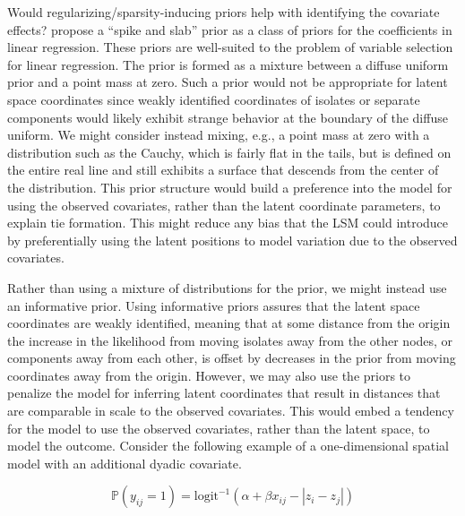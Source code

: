 \documentclass[11pt]{article}
\begin{document}
Would regularizing/sparsity-inducing priors help with identifying the covariate effects? \cite{mitchell1988} propose a ``spike and slab'' prior as a class of priors for the coefficients in linear regression. These priors are well-suited to the problem of variable selection for linear regression. The prior is formed as a mixture between a diffuse uniform prior and a point mass at zero. Such a prior would not be appropriate for latent space coordinates since weakly identified coordinates of isolates or separate components would likely exhibit strange behavior at the boundary of the diffuse uniform. We might consider instead mixing, e.g., a point mass at zero with a distribution such as the Cauchy, which is fairly flat in the tails, but is defined on the entire real line and still exhibits a surface that descends from the center of the distribution. This prior structure would build a preference into the model for using the observed covariates, rather than the latent coordinate parameters, to explain tie formation. This might reduce any bias that the LSM could introduce by preferentially using the latent positions to model variation due to the observed covariates.


Rather than using a mixture of distributions for the prior, we might instead use an informative prior. Using informative priors assures that the latent space coordinates are weakly identified, meaning that at some distance from the origin the increase in the likelihood from moving isolates away from the other nodes, or components away from each other, is offset by decreases in the prior from moving coordinates away from the origin. However, we may also use the priors to penalize the model for inferring latent coordinates that result in distances that are comparable in scale to the observed covariates. This would embed a tendency for the model to use the observed covariates, rather than the latent space, to model the outcome. Consider the following example of a one-dimensional spatial model with an additional dyadic covariate. 

$$\mathbb{P}(y_{ij} = 1) = \text{logit}^{-1}(\alpha + \beta x_{ij} -  |z_i - z_j|)$$
\end{document}
